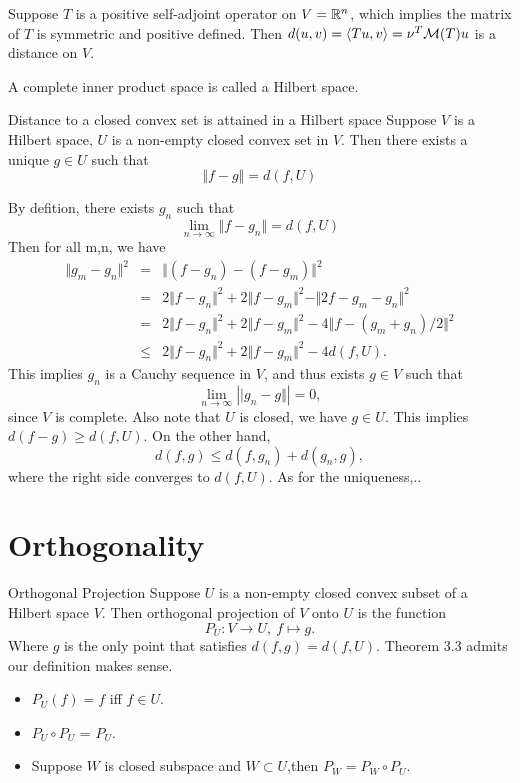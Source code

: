 \begin{sexample}{}{}
Suppose $T$ is a positive self-adjoint operator on $V=\mathbb{R}^n$, which implies the matrix of $T$ is symmetric and positive defined. Then $d(u,v)={\langle Tu,v\rangle}=\nu^T\mathcal{M}(T)u$ is a distance on $V$.	
\end{sexample}

\begin{sdefinition}{}{}
A complete inner product space is called a Hilbert space.	
\end{sdefinition}

\begin{stheorem}{Distance to a closed convex set is attained in a Hilbert space}{}
Suppose $V$ is a Hilbert space, $U$ is a non-empty closed convex set in $V$. Then there exists a unique $g\in U$ such that 
$$
\Vert f-g \Vert = d(f,U)
$$
\end{stheorem}
\begin{Proof}
By defition, there exists $g_n$ such that 
$$
\lim_{n \to \infty} \Vert f-g_n \Vert= d(f,U)
$$
Then for all m,n, we have 
\begin{eqnarray*}
	\Vert g_m-g_n\Vert^2 &=& \Vert (f-g_n)-(f-g_m)\Vert^2 \\
	&=& 2\Vert f-g_n\Vert^2 + 2\Vert f-g_m\Vert^2 - \Vert 2f-g_m-g_n\Vert^2 \\
	&=& 2\Vert f-g_n\Vert^2 + 2\Vert f-g_m\Vert^2 - 4 \Vert f-(g_m+g_n)/2\Vert^2 \\
	&\leq &  2\Vert f-g_n\Vert^2 + 2\Vert f-g_m\Vert^2 - 4d(f,U). 
\end{eqnarray*}
This implies $g_n$ is a Cauchy sequence in $V$, and thus exists $g\in V$ such that 
$$
\lim_{n \to \infty}|\vert g_n -g\Vert| = 0,
$$
since $V$ is complete. Also note that $U$ is closed, we have $g\in U$. This implies $d(f-g)\geq d(f,U)$. On the other hand,
$$
d(f,g) \leq d(f,g_n)+d(g_n,g),
$$
where the right side converges to $d(f,U)$. As for the uniqueness,..
\end{Proof}
\section{Orthogonality}
\begin{sdefinition}{Orthogonal Projection}{}
Suppose $U$ is a non-empty closed convex subset of a Hilbert space $V$. Then orthogonal projection of $V$ onto $U$ is the function
$$
P_U: V \to U, \ f\mapsto g. 
$$
Where $g$ is the only point that satisfies $d(f,g)=d(f,U)$. Theorem 3.3 admits our definition makes sense.
\end{sdefinition}
\begin{sremark}{}{}
\begin{itemize}
	\item $P_U(f)=f$ iff $f\in U$.
	\item $P_U \circ P_U$ = $P_U$.
	\item Suppose $W$ is closed subspace and $W \subset U$,then $P_W=P_W \circ P_U$.
\end{itemize}
\end{sremark}

